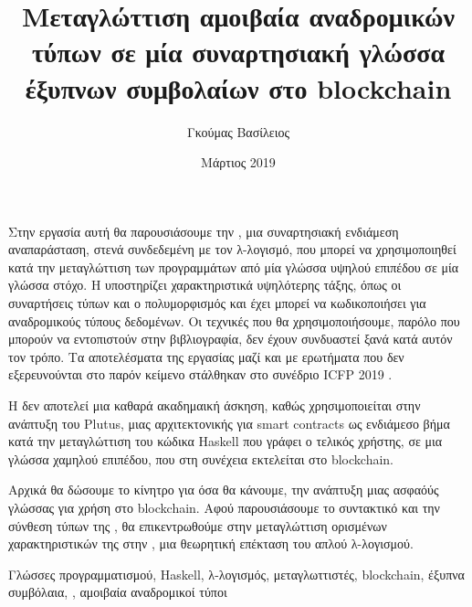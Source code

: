 \documentclass[diploma]{softlab-thesis}
\begin{document}

\frontmatter

\title{Μεταγλώττιση αμοιβαία αναδρομικών τύπων σε μία συναρτησιακή γλώσσα έξυπνων συμβολαίων στο blockchain}
\author{Γκούμας Βασίλειος}
\date{Μάρτιος 2019}




\maketitle



\begin{abstractgr}%


Στην εργασία αυτή θα παρουσιάσουμε την \FIR{}, μια συναρτησιακή ενδιάμεση αναπαράσταση, στενά
συνδεδεμένη με τον λ-λογισμό, που μπορεί να χρησιμοποιηθεί  κατά
την μεταγλώττιση των προγραμμάτων από μία γλώσσα υψηλού επιπέδου σε μία γλώσσα στόχο. Η \FIR{}
υποστηρίζει χαρακτηριστικά υψηλότερης τάξης, όπως οι συναρτήσεις τύπων
και ο πολυμορφισμός και έχει μπορεί να κωδικοποιήσει για αναδρομικούς τύπους δεδομένων. Οι τεχνικές
που θα χρησιμοποιήσουμε, παρόλο που μπορούν να εντοπιστούν στην βιβλιογραφία, δεν έχουν συνδυαστεί
ξανά κατά αυτόν τον τρόπο. Τα αποτελέσματα της εργασίας μαζί και με ερωτήματα που δεν εξερευνούνται
στο παρόν κείμενο στάλθηκαν στο συνέδριο ICFP 2019 .

Η \FIR{} δεν αποτελεί μια καθαρά ακαδημαική άσκηση, καθώς χρησιμοποιείται στην ανάπτυξη του Plutus,
μιας αρχιτεκτονικής για smart contracts ως ενδιάμεσο βήμα κατά την μεταγλώττιση του
κώδικα Haskell που γράφει ο τελικός χρήστης, σε μια γλώσσα χαμηλού επιπέδου, που στη συνέχεια
εκτελείται στο blockchain.

Αρχικά θα δώσουμε το κίνητρο για όσα θα κάνουμε, την ανάπτυξη μιας ασφαόύς γλώσσας για
χρήση στο blockchain.  Αφού παρουσιάσουμε το συντακτικό και την σύνθεση τύπων της \FIR{}, θα επικεντρωθούμε  στην
μεταγλώττιση ορισμένων χαρακτηριστικών της στην \FOMF, μια θεωρητική επέκταση του απλού λ-λογισμού.

\begin{keywordsgr}
Γλώσσες προγραμματισμού, Haskell, λ-λογισμός, μεταγλωττιστές, blockchain, έξυπνα συμβόλαια, \FOM{},
αμοιβαία αναδρομικοί τύποι
\end{keywordsgr}
\end{abstractgr}
\end{document}
